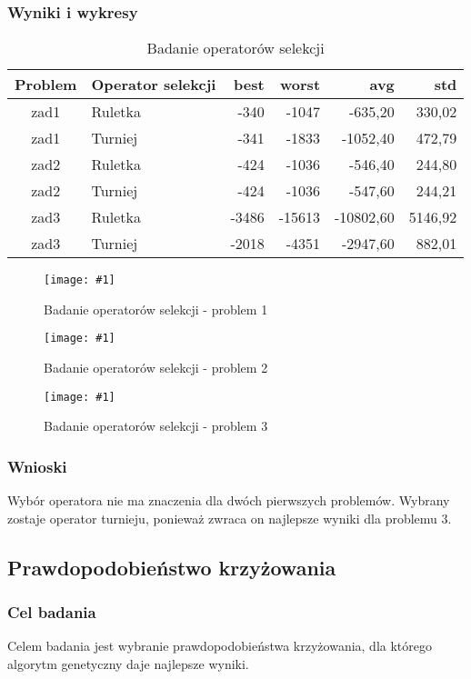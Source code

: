 \documentclass[12pt,a4paper]{article}
\newcommand{\image}[2] {
    \begin{figure}[H]
        \begin{center}
            \texttt{[image: \#1]}
        \end{center}
        \caption{#2}
        \label{#1}
    \end{figure}
}
\begin{document}
\subsubsection{Wyniki i wykresy}
\begin{table}[htbp]
  \centering
    \begin{tabular}{clrrrr}
    \multicolumn{1}{p{4.215em}}{\textbf{Problem}} & \multicolumn{1}{p{4.215em}}{\textbf{Operator selekcji}} & \multicolumn{1}{p{4.215em}}{\textbf{best}} & \multicolumn{1}{p{4.215em}}{\textbf{worst}} & \multicolumn{1}{p{4.215em}}{\textbf{avg}} & \multicolumn{1}{p{4.215em}}{\textbf{std}} \\
    \midrule
    zad1  & Ruletka & -340  & -1047 & -635,20 & 330,02 \\
    zad1  & Turniej & -341  & -1833 & -1052,40 & 472,79 \\
    \midrule
    zad2  & Ruletka & -424  & -1036 & -546,40 & 244,80 \\
    zad2  & Turniej & -424  & -1036 & -547,60 & 244,21 \\
    \midrule
    zad3  & Ruletka & -3486 & -15613 & -10802,60 & 5146,92 \\
    zad3  & Turniej & -2018 & -4351 & -2947,60 & 882,01 \\
    \end{tabular}%
  \label{tab:addlabel}%
  \caption{Badanie operatorów selekcji}
\end{table}%

\image{images/Badanie operatorów_1}{Badanie operatorów selekcji - problem 1}
\image{images/Badanie operatorów_2}{Badanie operatorów selekcji - problem 2}
\image{images/Badanie operatorów_3}{Badanie operatorów selekcji - problem 3}
\subsubsection{Wnioski}
Wybór operatora nie ma znaczenia dla dwóch pierwszych problemów.
Wybrany zostaje operator turnieju, ponieważ zwraca on najlepsze wyniki dla problemu 3.

\subsection{Prawdopodobieństwo krzyżowania}
\subsubsection{Cel badania}
Celem badania jest wybranie prawdopodobieństwa krzyżowania, dla którego algorytm genetyczny daje najlepsze wyniki.
\end{document}
